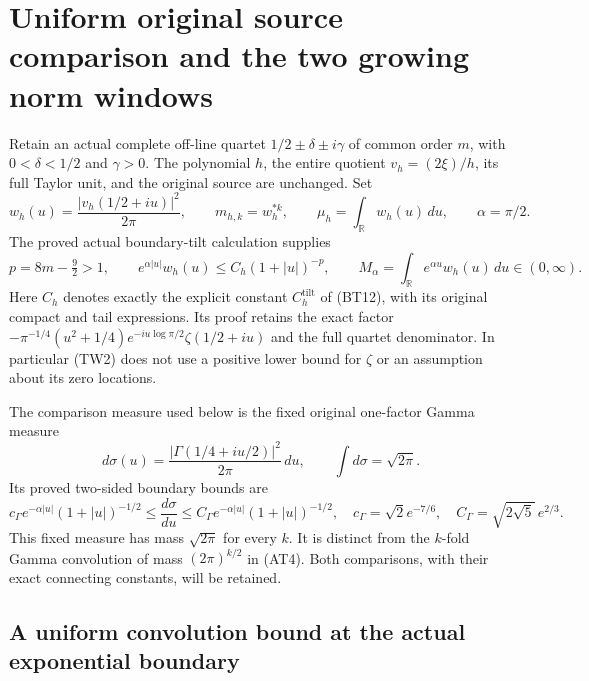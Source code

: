 \section{Uniform original source comparison and the two growing norm windows}

Retain an actual complete off-line quartet
$1/2\pm\delta\pm i\gamma$ of common order $m$, with
$0<\delta<1/2$ and $\gamma>0$.  The polynomial $h$, the entire quotient
$v_h=(2\xi)/h$, its full Taylor unit, and the original source are unchanged.
Set
\[
 w_h(u)=\frac{|v_h(1/2+iu)|^2}{2\pi},\qquad
 m_{h,k}=w_h^{*k},\qquad \mu_h=\int_{\mathbb{R}}w_h(u)\,du,
 \qquad \alpha=\pi/2.
 \tag{TW1}
\]
The proved actual boundary-tilt calculation supplies
\[
 p=8m-\tfrac92>1,\qquad
 e^{\alpha|u|}w_h(u)\leq C_h(1+|u|)^{-p},\qquad
 M_\alpha=\int_{\mathbb{R}}e^{\alpha u}w_h(u)\,du\in(0,\infty).
 \tag{TW2}
\]
Here $C_h$ denotes exactly the explicit constant $C_h^{\mathrm{tilt}}$
of (BT12), with its original compact and tail expressions.
Its proof retains the exact factor
$-\pi^{-1/4}(u^2+1/4)e^{-iu\log\pi/2}\zeta(1/2+iu)$
and the full quartet denominator.  In particular (TW2) does not use a
positive lower bound for $\zeta$ or an assumption about its zero locations.

The comparison measure used below is the fixed original one-factor
Gamma measure
\[
 d\sigma(u)=\frac{|\Gamma(1/4+iu/2)|^2}{2\pi}\,du,
 \qquad \int d\sigma=\sqrt{2\pi}.
 \tag{TW3}
\]
Its proved two-sided boundary bounds are
\[
 c_\Gamma e^{-\alpha|u|}(1+|u|)^{-1/2}
 \leq\frac{d\sigma}{du}
 \leq C_\Gamma e^{-\alpha|u|}(1+|u|)^{-1/2},
 \quad
 c_\Gamma=\sqrt2e^{-7/6},\quad
 C_\Gamma=\sqrt{2\sqrt5}\,e^{2/3}.
 \tag{TW4}
\]
This fixed measure has mass $\sqrt{2\pi}$ for every $k$.  It is distinct
from the $k$-fold Gamma convolution of mass $(2\pi)^{k/2}$ in (AT4).
Both comparisons, with their exact connecting constants, will be retained.

\subsection{A uniform convolution bound at the actual exponential boundary}

